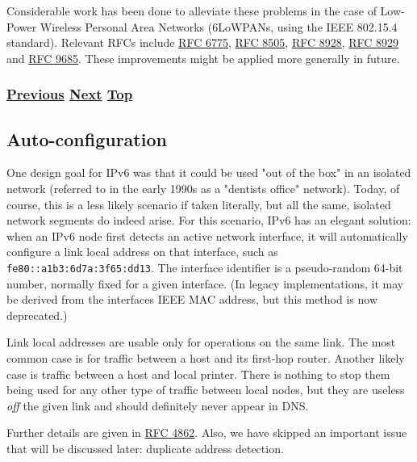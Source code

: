 \documentclass[
]{article}
\begin{document}
Considerable work has been done to alleviate these problems in the case
of Low-Power Wireless Personal Area Networks (6LoWPANs, using the IEEE
802.15.4 standard). Relevant RFCs include
\href{https://www.rfc-editor.org/info/rfc6775}{RFC 6775},
\href{https://www.rfc-editor.org/info/rfc8505}{RFC 8505},
\href{https://www.rfc-editor.org/info/rfc8928}{RFC 8928},
\href{https://www.rfc-editor.org/info/rfc8929}{RFC 8929} and
\href{https://www.rfc-editor.org/info/rfc9685}{RFC 9685}. These
improvements might be applied more generally in future.

\subsubsection{\texorpdfstring{\hyperref[layer-2-functions]{Previous}
\hyperref[auto-configuration]{Next}
\hyperref[ipv6-basic-technology]{Top}}{Previous Next Top}}\label{previous-next-top-11}

\pagebreak

\subsection{Auto-configuration}\label{auto-configuration}

One design goal for IPv6 was that it could be used "out of the box" in
an isolated network (referred to in the early 1990s as a
"dentist\textquotesingle s office" network). Today, of course, this is a
less likely scenario if taken literally, but all the same, isolated
network segments do indeed arise. For this scenario, IPv6 has an elegant
solution: when an IPv6 node first detects an active network interface,
it will automatically configure a link local address on that interface,
such as \texttt{fe80::a1b3:6d7a:3f65:dd13}. The interface identifier is
a pseudo-random 64-bit number, normally fixed for a given interface. (In
legacy implementations, it may be derived from the
interface\textquotesingle s IEEE MAC address, but this method is now
deprecated.)

Link local addresses are usable only for operations on the same link.
The most common case is for traffic between a host and its first-hop
router. Another likely case is traffic between a host and local printer.
There is nothing to stop them being used for any other type of traffic
between local nodes, but they are useless \emph{off} the given link and
should definitely never appear in DNS.

Further details are given in
\href{https://www.rfc-editor.org/info/rfc4862}{RFC 4862}. Also, we have
skipped an important issue that will be discussed later: duplicate
address detection.
\end{document}
